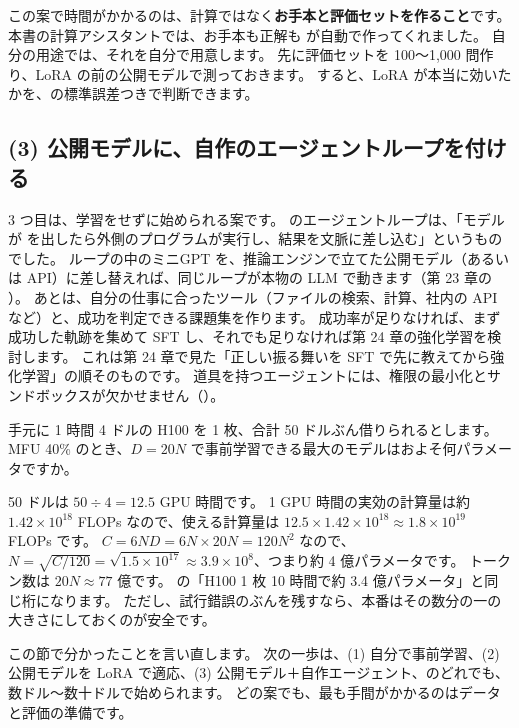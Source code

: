 この案で時間がかかるのは、計算ではなく\textbf{お手本と評価セットを作ること}です。
本書の計算アシスタントでは、お手本も正解も  が自動で作ってくれました。
自分の用途では、それを自分で用意します。
先に評価セットを 100〜1,000 問作り、LoRA の前の公開モデルで測っておきます。
すると、LoRA が本当に効いたかを、の標準誤差つきで判断できます。

\subsection*{(3) 公開モデルに、自作のエージェントループを付ける}

3 つ目は、学習をせずに始められる案です。
のエージェントループは、「モデルが  を出したら外側のプログラムが実行し、結果を文脈に差し込む」というものでした。
ループの中のミニGPT を、推論エンジンで立てた公開モデル（あるいは API）に差し替えれば、同じループが本物の LLM で動きます（第 23 章の ）。
あとは、自分の仕事に合ったツール（ファイルの検索、計算、社内の API など）と、成功を判定できる課題集を作ります。
成功率が足りなければ、まず成功した軌跡を集めて SFT し、それでも足りなければ第 24 章の強化学習を検討します。
これは第 24 章で見た「正しい振る舞いを SFT で先に教えてから強化学習」の順そのものです。
道具を持つエージェントには、権限の最小化とサンドボックスが欠かせません（）。

\begin{quiz}
手元に 1 時間 4 ドルの H100 を 1 枚、合計 50 ドルぶん借りられるとします。
MFU 40\% のとき、$D=20N$ で事前学習できる最大のモデルはおよそ何パラメータですか。
\end{quiz}

50 ドルは $50 \div 4 = 12.5$ GPU 時間です。
1 GPU 時間の実効の計算量は約 $1.42\times10^{18}$ FLOPs なので、使える計算量は $12.5 \times 1.42\times10^{18} \approx 1.8\times10^{19}$ FLOPs です。
$C = 6ND = 6N \times 20N = 120N^{2}$ なので、$N = \sqrt{C/120} = \sqrt{1.5\times10^{17}} \approx 3.9\times10^{8}$、つまり約 4 億パラメータです。
トークン数は $20N \approx 77$ 億です。
の「H100 1 枚 10 時間で約 3.4 億パラメータ」と同じ桁になります。
ただし、試行錯誤のぶんを残すなら、本番はその数分の一の大きさにしておくのが安全です。

この節で分かったことを言い直します。
次の一歩は、(1) 自分で事前学習、(2) 公開モデルを LoRA で適応、(3) 公開モデル＋自作エージェント、のどれでも、数ドル〜数十ドルで始められます。
どの案でも、最も手間がかかるのはデータと評価の準備です。

